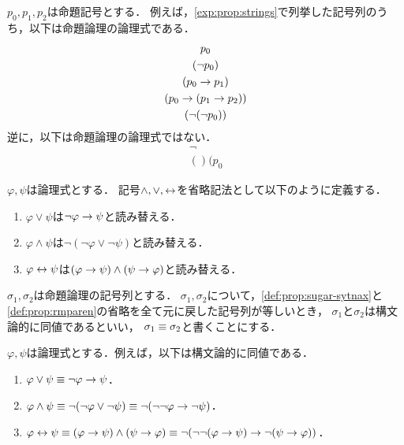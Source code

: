 \begin{myExample}[命題論理の論理式の例]
  $p_0,p_1,p_2$は命題記号とする．
  例えば，\ref{exp:prop:strings}で列挙した記号列のうち，以下は命題論理の論理式である．
  \begin{gather*}
    p_0 \\
    (\neg p_0) \\
    (p_0 \to p_1) \\
    (p_0 \to (p_1 \to p_2)) \\
    (\lnot(\lnot p_0))
  \end{gather*}
  逆に，以下は命題論理の論理式ではない．
  \begin{gather*}
    \neg \\
    ()(p_0
  \end{gather*}
\end{myExample}

\begin{myDefinition}
  \label{def:prop:sugar-sytnax}
  $\varphi, \psi$は論理式とする．
  記号$\land, \lor, \leftrightarrow$を省略記法として以下のように定義する．
  \begin{enumerate}
    \item $\varphi \lor \psi$は$\lnot\varphi \to \psi$と読み替える．
    \item $\varphi \land \psi$は$\lnot(\lnot\varphi \lor \lnot\psi)$と読み替える．
    \item $\varphi \leftrightarrow \psi$は$(\varphi \to \psi) \land (\psi \to \varphi)$と読み替える．
  \end{enumerate}
\end{myDefinition}

\begin{myDefinition}[括弧の省略]
  \label{def:prop:rmparen}
\end{myDefinition}

\begin{myDefinition}[構文論的同値]
  $\sigma_1,\sigma_2$は命題論理の記号列とする．
  $\sigma_1,\sigma_2$について，\ref*{def:prop:sugar-sytnax}と\ref*{def:prop:rmparen}の省略を全て元に戻した記号列が等しいとき，
  $\sigma_1$と$\sigma_2$は構文論的に同値であるといい，
  $\sigma_1 \equiv \sigma_2$と書くことにする．
\end{myDefinition}

\begin{myExample}[構文論的同値の例]
  \label{exp:prop:syntax-semeq}
  $\varphi, \psi$は論理式とする．例えば，以下は構文論的に同値である．
  \begin{enumerate}
    \item $\varphi \lor \psi \equiv \lnot\varphi \to \psi$．
    \item $\varphi \land \psi \equiv \lnot(\lnot\varphi \lor \lnot\psi) \equiv \lnot(\lnot\lnot\varphi \to \lnot\psi)$．
    \item $\varphi \leftrightarrow \psi \equiv (\varphi \to \psi) \land (\psi \to \varphi) \equiv \lnot(\lnot\lnot(\varphi \to \psi) \to \lnot(\psi \to \varphi))$．
  \end{enumerate}
\end{myExample}

